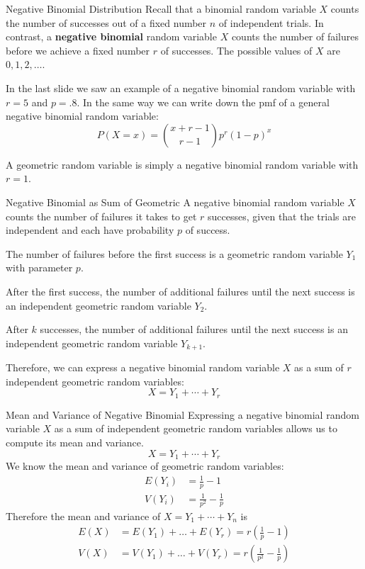 \documentclass[xcolor=table]{beamer}
\renewcommand{\emph}{\textbf}
\begin{document}
\begin{frame}{Negative Binomial Distribution}
Recall that a binomial random variable $X$ counts the number of successes out of a fixed number $n$ of independent trials. In contrast, a \emph{negative binomial} random variable $X$ counts the number of failures before we achieve a fixed number $r$ of successes. The possible values of $X$ are $0, 1, 2, \dots$.

\pause\vspace{.3cm} In the last slide we saw an example of a negative binomial random variable with $r=5$ and $p=.8$. In the same way we can write down the pmf of a general negative binomial random variable:
$$P(X=x)=\binom{x+r-1}{r-1} p^r(1-p)^x$$

\pause A geometric random variable is simply a negative binomial random variable with $r=1$. 
\end{frame}

\begin{frame}{Negative Binomial as Sum of Geometric}
A negative binomial random variable $X$ counts the number of failures it takes to get $r$ successes, given that the trials are independent and each have probability $p$ of success. 

\pause\vspace{.2cm}
The number of failures before the first success is a geometric random variable $Y_1$ with parameter $p$. 

\pause\vspace{.2cm}
After the first success, the number of additional failures until the next success is an independent geometric random variable $Y_2$. 

\pause\vspace{.2cm}
After $k$ successes, the number of additional failures until the next success is an independent geometric random variable $Y_{k+1}$. 

\pause\vspace{.2cm}
Therefore, we can express a negative binomial random variable $X$ as a sum of $r$ independent geometric random variables:
$$X=Y_1+\cdots+Y_r$$
\end{frame}

\begin{frame}{Mean and Variance of Negative Binomial}
Expressing a negative binomial random variable $X$ as a sum of independent geometric random variables allows us to compute its mean and variance. 
$$X=Y_1+\cdots+Y_r$$
\pause We know the mean and variance of geometric random variables:
\begin{align*}
E(Y_i) &= \frac1p-1 \\
V(Y_i) &= \frac1{p^2}-\frac1p
\end{align*}
\pause Therefore the mean and variance of $X=Y_1+\cdots+Y_n$ is
\begin{align*}
E(X) &= E(Y_1)+\dots+E(Y_r) = r\left(\frac1p-1\right) \\
V(X) &= V(Y_1)+\dots+V(Y_r) = r\left(\frac1{p^2}-\frac1p\right)
\end{align*}
\end{frame}
\end{document}
